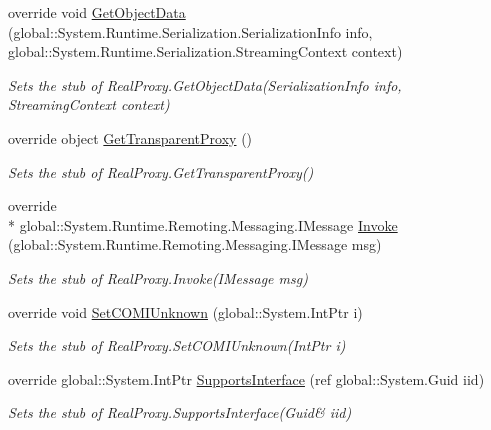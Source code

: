 \begin{DoxyCompactItemize}
override void \hyperlink{class_system_1_1_runtime_1_1_remoting_1_1_proxies_1_1_fakes_1_1_stub_real_proxy_aa7a35cb7ef54ca6bfca413b5000432ab}{Get\-Object\-Data} (global\-::\-System.\-Runtime.\-Serialization.\-Serialization\-Info info, global\-::\-System.\-Runtime.\-Serialization.\-Streaming\-Context context)
\begin{DoxyCompactList}\small\item\em Sets the stub of Real\-Proxy.\-Get\-Object\-Data(\-Serialization\-Info info, Streaming\-Context context)\end{DoxyCompactList}\item 
override object \hyperlink{class_system_1_1_runtime_1_1_remoting_1_1_proxies_1_1_fakes_1_1_stub_real_proxy_ae7549dc3705c8250ad43d8a57196a174}{Get\-Transparent\-Proxy} ()
\begin{DoxyCompactList}\small\item\em Sets the stub of Real\-Proxy.\-Get\-Transparent\-Proxy()\end{DoxyCompactList}\item 
override \\*
global\-::\-System.\-Runtime.\-Remoting.\-Messaging.\-I\-Message \hyperlink{class_system_1_1_runtime_1_1_remoting_1_1_proxies_1_1_fakes_1_1_stub_real_proxy_a2cde8a07f118e6966f5dd2d670024f03}{Invoke} (global\-::\-System.\-Runtime.\-Remoting.\-Messaging.\-I\-Message msg)
\begin{DoxyCompactList}\small\item\em Sets the stub of Real\-Proxy.\-Invoke(\-I\-Message msg)\end{DoxyCompactList}\item 
override void \hyperlink{class_system_1_1_runtime_1_1_remoting_1_1_proxies_1_1_fakes_1_1_stub_real_proxy_a15a6368d5ebc16cd14be634ba825600f}{Set\-C\-O\-M\-I\-Unknown} (global\-::\-System.\-Int\-Ptr i)
\begin{DoxyCompactList}\small\item\em Sets the stub of Real\-Proxy.\-Set\-C\-O\-M\-I\-Unknown(\-Int\-Ptr i)\end{DoxyCompactList}\item 
override global\-::\-System.\-Int\-Ptr \hyperlink{class_system_1_1_runtime_1_1_remoting_1_1_proxies_1_1_fakes_1_1_stub_real_proxy_a5804d854b4d443513ace66557f42cc30}{Supports\-Interface} (ref global\-::\-System.\-Guid iid)
\begin{DoxyCompactList}\small\item\em Sets the stub of Real\-Proxy.\-Supports\-Interface(Guid\& iid)\end{DoxyCompactList}\end{DoxyCompactItemize}
